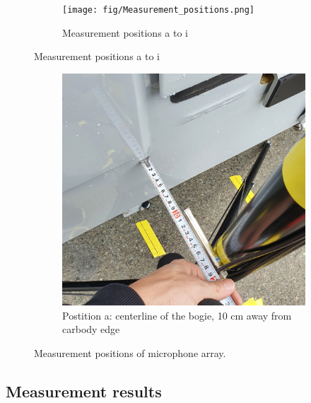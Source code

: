 \begin{figure}[H]
     \centering
     \begin{subfigure}[b]{\textwidth}
         \centering
         \texttt{[image: fig/Measurement\_positions.png]}
         \caption{Measurement positions a to i}
     \end{subfigure}
\end{figure}

\begin{figure}[H]\ContinuedFloat
    \centering
    \begin{subfigure}[b]{0.6\textwidth}
         \centering
         \includegraphics[width=\linewidth]{fig/position_of_microphones.jpg}
         \caption{Postition a: centerline of the bogie, 10 cm away from carbody edge}
         \label{fig:position_a}
     \end{subfigure}
     \caption{Measurement positions of microphone array.}
     \label{fig:microphoneposition}
\end{figure}

\subsection*{Measurement results}

